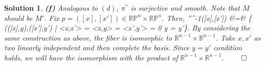 \documentclass{article} %
\def\eQb#1\eQe{\begin{eqnarray*}#1\end{eqnarray*}}
\theoremstyle{quest}
\newtheorem*{solution}{Solution}
\begin{document}
\begin{solution}
\bigskip

\textbf{(f)} Analogous to $(d)$, $\pi^{''}$ is surjective and smooth. Note 
that $M$ should be $M'$. Fix $p = ([x],[x']) \in \mathbb{RP}^{n} \times 
\mathbb{RP}^{n}$. Then,
\eQb
\pi''^{-1}([x],[x']) &=& \{ (([x],y),([x'],y') \> | \> <x,x'> = <x,y> = <x',y'> = 0
\>\>\> y = y'\}.
\eQe
By considering the same construction as above, the fiber is isomorphic to
$\mathbb{R}^{n-1} \times \mathbb{R}^{n-1}$. Take $x,x'$ as two linearly independent
and then complete the basis. Since $y=y'$ condition holds, we will have
the isomorphism with the product of $\mathbb{R}^{n-1}\times \mathbb{R}^{n-1}$.
\hfill $\qed$
 
\end{solution}
\end{document}
